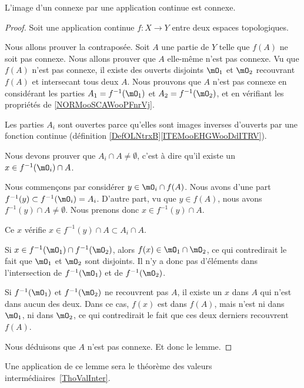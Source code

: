 \begin{lemma}   \label{LemConncontconn}
	L'image d'un connexe par une application continue est connexe.
\end{lemma}

\begin{proof}
	Soit une application continue \(f \colon X\to Y  \) entre deux espaces topologiques.

	Nous allons prouver la contraposée. Soit \( A\) une partie de \( Y\) telle que \( f(A)\) ne soit pas connexe. Nous allons prouver que \( A\) elle-même n'est pas connexe. Vu que \( f(A)\) n'est pas connexe, il existe des ouverts disjoints \( \mO_1\) et \( \mO_2\) recouvrant \( f(A)\) et intersecant tous deux \( A\). Nous prouvons que \( A\) n'est pas connexe en considérant les parties  \( A_1=f^{-1}(\mO_1)\) et \( A_2=f^{-1}(\mO_2)\), et en vérifiant les propriétés de \ref{NORMooSCAWooPFnrVj}.

	\begin{subproof}
		Les parties \( A_i\) sont ouvertes parce qu'elles sont images inverses d'ouverts par une fonction continue (définition \ref{DefOLNtrxB}\ref{ITEMooEHGWooDdITRV}).

		Nous devons prouver que \( A_i\cap A\neq \emptyset\), c'est à dire qu'il existe un \( x\in f^{-1}(\mO_i)\cap A\).

		Nous commençons par considérer \( y\in \mO_i\cap f(A)\). Nous avons d'une part \( f^{-1}(y)\subset f^{-1}(\mO_i)=A_i\). D'autre part, vu que \( y\in f(A)\), nous avons \( f^{-1}(y)\cap A\neq \emptyset\). Nous prenons donc \( x\in f^{-1}(y)\cap A\).

		Ce \( x\) vérifie \( x\in f^{-1}(y)\cap A\subset A_i\cap A\).

		Si \( x\in f^{-1}(\mO_1)\cap f^{-1}(\mO_2)\), alors \( f(x)\in \mO_1\cap\mO_2\), ce qui contredirait le fait que \( \mO_1\) et \( \mO_2\) sont disjoints. Il n'y a donc pas d'éléments dans l'intersection de \( f^{-1}(\mO_1)\) et de \( f^{-1}(\mO_2)\).

		Si \( f^{-1}(\mO_1)\) et \( f^{-1}(\mO_2)\) ne recouvrent pas \( A\), il existe un \( x\) dans \( A\) qui n'est dans aucun des deux. Dans ce cas, \( f(x)\) est dans \( f(A)\), mais n'est ni dans \( \mO_1\), ni dans \( \mO_2\), ce qui contredirait le fait que ces deux derniers recouvrent \( f(A)\).
	\end{subproof}
	Nous déduisons que \( A\) n'est pas connexe. Et donc le lemme.
\end{proof}
Une application de ce lemme sera le théorème des valeurs intermédiaires~\ref{ThoValInter}.

